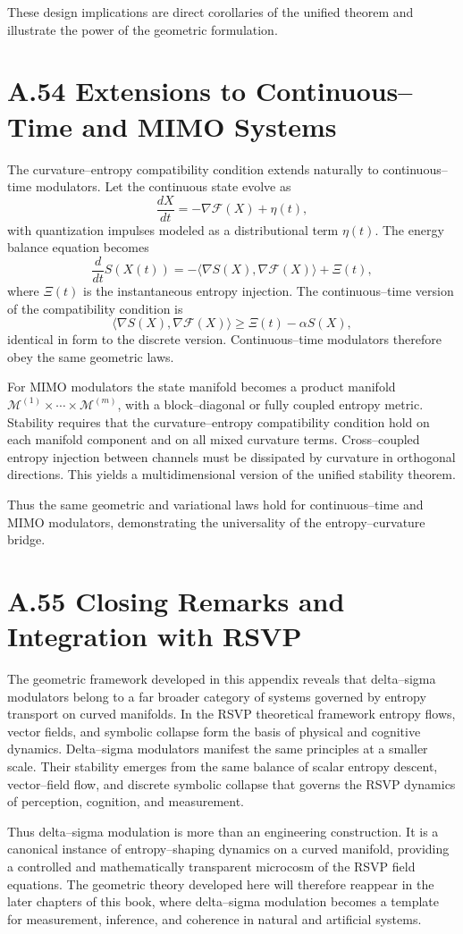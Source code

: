 These design implications are direct corollaries of the unified theorem and illustrate the power of the geometric formulation.

\section{A.54 Extensions to Continuous–Time and MIMO Systems}

The curvature–entropy compatibility condition extends naturally to continuous–time modulators. Let the continuous state evolve as
\[
\frac{dX}{dt} = -\nabla\mathcal{F}(X) + \eta(t),
\]
with quantization impulses modeled as a distributional term \(\eta(t)\). The energy balance equation becomes
\[
\frac{d}{dt} S(X(t)) = -\langle\nabla S(X), \nabla\mathcal{F}(X)\rangle + \Xi(t),
\]
where \(\Xi(t)\) is the instantaneous entropy injection. The continuous–time version of the compatibility condition is
\[
\langle\nabla S(X), \nabla\mathcal{F}(X)\rangle \ge \Xi(t) - \alpha S(X),
\]
identical in form to the discrete version. Continuous–time modulators therefore obey the same geometric laws.

For MIMO modulators the state manifold becomes a product manifold \(\mathcal{M}^{(1)} \times \cdots \times \mathcal{M}^{(m)}\), with a block–diagonal or fully coupled entropy metric. Stability requires that the curvature–entropy compatibility condition hold on each manifold component and on all mixed curvature terms. Cross–coupled entropy injection between channels must be dissipated by curvature in orthogonal directions. This yields a multidimensional version of the unified stability theorem.

Thus the same geometric and variational laws hold for continuous–time and MIMO modulators, demonstrating the universality of the entropy–curvature bridge.

\section{A.55 Closing Remarks and Integration with RSVP}

The geometric framework developed in this appendix reveals that delta–sigma modulators belong to a far broader category of systems governed by entropy transport on curved manifolds. In the RSVP theoretical framework entropy flows, vector fields, and symbolic collapse form the basis of physical and cognitive dynamics. Delta–sigma modulators manifest the same principles at a smaller scale. Their stability emerges from the same balance of scalar entropy descent, vector–field flow, and discrete symbolic collapse that governs the RSVP dynamics of perception, cognition, and measurement.

Thus delta–sigma modulation is more than an engineering construction. It is a canonical instance of entropy–shaping dynamics on a curved manifold, providing a controlled and mathematically transparent microcosm of the RSVP field equations. The geometric theory developed here will therefore reappear in the later chapters of this book, where delta–sigma modulation becomes a template for measurement, inference, and coherence in natural and artificial systems.

